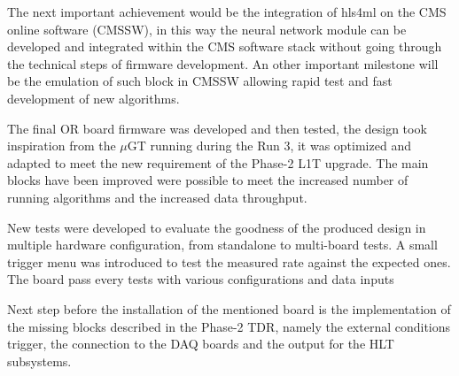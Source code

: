 \documentclass[../../main.tex]{subfiles}
\begin{document}
The next important achievement would be the integration of hls4ml on the CMS online software (CMSSW), in this way the neural network module can be developed and integrated within the CMS software stack without going through the technical steps of firmware development. An other important milestone will be the emulation of such block in CMSSW allowing rapid test and fast development of new algorithms. 


The final OR board firmware was developed and then tested, the design took inspiration from the $\mu$GT  running during the Run 3, it was optimized and adapted to meet the new requirement of the Phase-2 L1T upgrade. The main blocks have been improved were possible to meet the increased number of running algorithms and the increased data throughput.  

New tests were developed to evaluate the goodness of the produced design in multiple hardware configuration, from standalone to multi-board tests. A small trigger menu was introduced to test the measured rate against the expected ones. The board pass every tests with various configurations and data inputs

Next step before the installation of the mentioned board is the implementation of the missing blocks described in the Phase-2 TDR\cite{L1T-2up}, namely the external conditions trigger, the connection to the DAQ boards and the output for the HLT subsystems.


    
\end{document}
